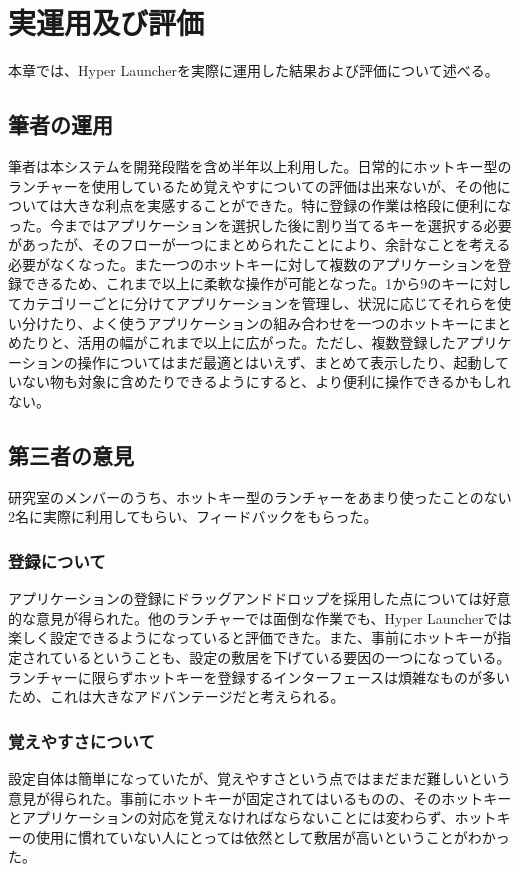 \chapter{実運用及び評価}
本章では、Hyper Launcherを実際に運用した結果および評価について述べる。

\newpage

\section{筆者の運用}
筆者は本システムを開発段階を含め半年以上利用した。日常的にホットキー型のランチャーを使用しているため覚えやすについての評価は出来ないが、その他については大きな利点を実感することができた。特に登録の作業は格段に便利になった。今まではアプリケーションを選択した後に割り当てるキーを選択する必要があったが、そのフローが一つにまとめられたことにより、余計なことを考える必要がなくなった。また一つのホットキーに対して複数のアプリケーションを登録できるため、これまで以上に柔軟な操作が可能となった。1から9のキーに対してカテゴリーごとに分けてアプリケーションを管理し、状況に応じてそれらを使い分けたり、よく使うアプリケーションの組み合わせを一つのホットキーにまとめたりと、活用の幅がこれまで以上に広がった。ただし、複数登録したアプリケーションの操作についてはまだ最適とはいえず、まとめて表示したり、起動していない物も対象に含めたりできるようにすると、より便利に操作できるかもしれない。

\section{第三者の意見}
研究室のメンバーのうち、ホットキー型のランチャーをあまり使ったことのない2名に実際に利用してもらい、フィードバックをもらった。

\subsection{登録について}
アプリケーションの登録にドラッグアンドドロップを採用した点については好意的な意見が得られた。他のランチャーでは面倒な作業でも、Hyper Launcherでは楽しく設定できるようになっていると評価できた。また、事前にホットキーが指定されているということも、設定の敷居を下げている要因の一つになっている。ランチャーに限らずホットキーを登録するインターフェースは煩雑なものが多いため、これは大きなアドバンテージだと考えられる。

\subsection{覚えやすさについて}
設定自体は簡単になっていたが、覚えやすさという点ではまだまだ難しいという意見が得られた。事前にホットキーが固定されてはいるものの、そのホットキーとアプリケーションの対応を覚えなければならないことには変わらず、ホットキーの使用に慣れていない人にとっては依然として敷居が高いということがわかった。

